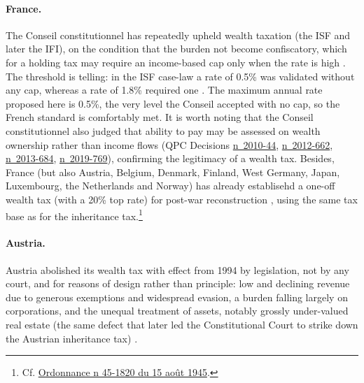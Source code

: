 \documentclass[../../main]{subfiles}
\begin{document}
\paragraph{France.} The Conseil constitutionnel has repeatedly upheld wealth taxation (the ISF and later the IFI), on the condition that the burden not become confiscatory, which for a holding tax may require an income-based cap only when the rate is high \citep{CPO2018, ConseilConstitutionnel2012}. The threshold is telling: in the ISF case-law a rate of 0.5\% was validated without any cap, whereas a rate of 1.8\% required one \citep{CPO2018}.
The maximum annual rate proposed here is 0.5\%, the very level the Conseil accepted with no cap, so the French standard is comfortably met. It is worth noting that the Conseil constitutionnel also judged that ability to pay may be assessed on wealth ownership rather than income flows (QPC Decisions \href{https://www.legifrance.gouv.fr/cons/id/CONSTEXT000022961791}{n\textdegree~2010-44}, \href{https://www.legifrance.gouv.fr/juri/id/CONSTEXT000027147057}{n\textdegree~2012-662}, \href{https://www.legifrance.gouv.fr/cons/id/CONSTEXT000028438279}{n\textdegree~2013-684}, %
\href{https://www.legifrance.gouv.fr/jorf/id/JORFTEXT000038261491}{n\textdegree~2019-769}), %
confirming the legitimacy of a wealth tax. Besides, France (but also Austria, Belgium, Denmark, Finland, West Germany, Japan, Luxembourg, the Netherlands and Norway) has already establisehd a one-off wealth tax (with a 20\% top rate) for post-war reconstruction \citep{odonovan_one-off_2021}, using the same tax base as for the inheritance tax.\footnote{Cf. \href{https://www.legifrance.gouv.fr/jorf/id/JORFTEXT000000701436}{Ordonnance n\textdegree{} 45-1820 du 15 août 1945}.} 

\paragraph{Austria.} Austria abolished its wealth tax with effect from 1994 by legislation, not by any court, and for reasons of design rather than principle: low and declining revenue due to generous exemptions and widespread evasion, a burden falling largely on corporations, and the unequal treatment of assets, notably grossly under-valued real estate (the same defect that later led the Constitutional Court to strike down the Austrian inheritance tax) \citep{DGTaxud2026}.
\end{document}
